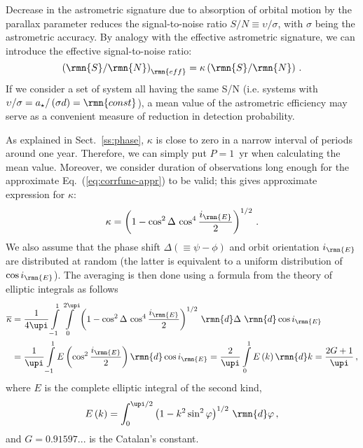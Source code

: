 \documentclass[fleqn,usenatbib,useAMS,usedcolumn]{mnras}
\begin{document}
Decrease in the astrometric signature due to absorption of orbital motion by the parallax parameter reduces the signal-to-noise ratio $S/N\equiv\upsilon/\sigma$, with $\sigma$ being the astrometric accuracy. By analogy with the effective astrometric signature, we can introduce the effective signal-to-noise ratio:
\begin{equation}
  \left(\rmn{S}/\rmn{N}\right)_\rmn{eff}=\kappa\left(\rmn{S}/\rmn{N}\right)\,.
\end{equation}
If we consider a set of system all having the same S/N (i.e. systems with $\upsilon/\sigma=a_\star/\left(\sigma d\right)=\rmn{const}$), a mean value of the astrometric efficiency may serve as a convenient measure of reduction in detection probability.

As explained in Sect.~\ref{ss:phase}, $\kappa$ is close to zero in a narrow interval of periods around one year. Therefore, we can simply put $P=1$~yr when calculating the mean value. Moreover, we consider duration of observations long enough for the approximate Eq.~(\ref{eq:corrfunc-appr}) to be valid; this gives approximate expression for $\kappa$:
\begin{equation}
  \kappa=\left(1-\cos^2\Delta\,\cos^4\frac{i_\rmn{E}}{2}\right)^{1/2}\,.
\end{equation}
We also assume that the phase shift $\Delta\left(\equiv\psi-\phi\right)$ and orbit orientation $i_\rmn{E}$ are distributed at random (the latter is equivalent to a uniform distribution of $\cos i_\rmn{E}$). The averaging is then done using a formula from the theory of elliptic integrals \citep[see][Section 6.148]{gradshteyn} as follows
\begin{equation}
 \begin{aligned}
  \overline{\kappa}
  &=\frac{1}{4\upi}
    \int\limits_{-1}^1\int\limits_0^{2\upi}
    \left(1-\cos^2\Delta\,\cos^4\frac{i_\rmn{E}}{2}\right)^{1/2}\,
     \rmn{d}\Delta\,\,\rmn{d}\cos i_\rmn{E}\\
  &=\frac{1}{\upi}\int\limits_{-1}^1 E\left(\cos^2\frac{i_\rmn{E}}{2}\right)\rmn{d}\cos i_\rmn{E}
  =\frac{2}{\upi}\int\limits_0^1 E\left(k\right)\rmn{d}k
  =\frac{2G+1}{\upi}\,,
 \end{aligned}
\end{equation}
where $E$ is the complete elliptic integral of the second kind,
\begin{equation}
  E\left(k\right)=\int_{0}^{\upi/2}\left(1-k^2\sin^2\varphi\right)^{1/2}\,\rmn{d}\varphi\,,
\end{equation}
and $G=0.91597...$ is the Catalan's constant.
\end{document}
